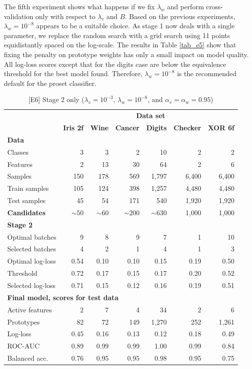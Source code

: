 %
The fifth experiment shows what happens if we fix $\lambda_w$ and perform cross-validation only with respect to $\lambda_v$ and $B$.
Based on the previous experiments, $\lambda_w=10^{-8}$ appears to be a suitable choice.
As stage 1 now deals with a single parameter, we replace the random search with a grid search using 11 points equidistantly spaced on the log-scale.
The results in Table \ref{tab_e5} show that fixing the penalty on prototype weights has only a small impact on model quality.
All log-loss scores except that for the digits case are below the equivalence threshold for the best model found.
Therefore, $\lambda_w=10^{-8}$ is the recommended default for the proset classifier.\par
%
\clearpage
%
\begin{table}
\caption{[E6] Stage 2 only ($\lambda_v=10^{-3}$, $\lambda_w=10^{-8}$, and $\alpha_v=\alpha_w=0.95$)}
\label{tab_e6}
%
\begin{center}
\small
\begin{tabular}{|lrrrrrr|}
\hline
&\multicolumn{6}{c|}{\textbf{\hrulefill\ Data set \hrulefill}}\\
&\textbf{Iris 2f}&\textbf{Wine}&\textbf{Cancer}&\textbf{Digits}&\textbf{Checker}&\textbf{XOR 6f}\\
\multicolumn{7}{|l|}{\textbf{Data}}\\
Classes&3&3&2&10&2&2\\
Features&2&13&30&64&2&6\\
Samples&150&178&569&1,797&6,400&6,400\\
Train samples&105&124&398&1,257&4,480&4,480\\
Test samples&45&54&171&540&1,920&1,920\\
\textbf{Candidates}&$\sim50$&$\sim60$&$\sim200$&$\sim630$&1,000&1,000\\
\multicolumn{7}{|l|}{\textbf{Stage 2}}\\
Optimal batches&9&8&9&7&1&10\\
Selected batches&4&2&1&4&1&3\\
Optimal log-loss&0.54&0.10&0.10&0.15&0.19&0.50\\
Threshold&0.72&0.17&0.15&0.17&0.20&0.52\\
Selected log-loss&0.71&0.15&0.12&0.16&0.19&0.51\\
\multicolumn{7}{|l|}{\textbf{Final model, scores for test data}}\\
Active features&2&7&4&34&2&6\\
Prototypes&82&72&149&1,270&252&1,261\\
Log-loss&0.45&0.16&0.13&0.12&0.18&0.49\\
ROC-AUC&0.89&0.99&0.99&1.00&0.99&0.84\\
Balanced acc.&0.76&0.95&0.95&0.98&0.95&0.75\\
\hline
\end{tabular}
\end{center}
\end{table}
